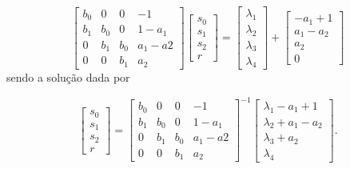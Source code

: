\begin{equation}
    \label{eq:equacoes-lineares-em-forma-matricial}
    \begin{bmatrix}
        b_0 & 0   & 0   & -1     \\ 
        b_1 & b_0 & 0   & 1-a_1  \\ 
        0   & b_1 & b_0 & a_1-a2 \\ 
        0   & 0   & b_1 & a_2
        \end{bmatrix}
        \begin{bmatrix}
        s_0 \\ 
        s_1 \\ 
        s_2 \\ 
        r
        \end{bmatrix}
        =
        \begin{bmatrix}
        \lambda_1\\ 
        \lambda_2\\ 
        \lambda_3\\ 
        \lambda_4
        \end{bmatrix}
        +
        \begin{bmatrix}
        -a_1+1\\ 
        a_1-a_2\\ 
        a_2\\ 
        0
        \end{bmatrix}
\end{equation} sendo a solução dada por 

\begin{equation}
    \label{eq:solucao-da-equacao-linear}
    \begin{bmatrix}
        s_0 \\ 
        s_1 \\ 
        s_2 \\ 
        r
        \end{bmatrix}
        =
        \begin{bmatrix}
        b_0 & 0   & 0   & -1     \\ 
        b_1 & b_0 & 0   & 1-a_1  \\ 
        0   & b_1 & b_0 & a_1-a2 \\ 
        0   & 0   & b_1 & a_2
        \end{bmatrix}^{-1}
        \begin{bmatrix}
        \lambda_1-a_1+1\\ 
        \lambda_2+a_1-a_2\\ 
        \lambda_3+a_2\\ 
        \lambda_4
        \end{bmatrix}.
\end{equation}

